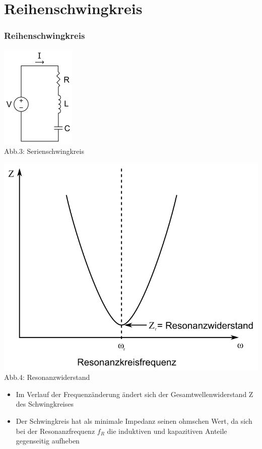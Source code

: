 \section*{Reihenschwingkreis}
\begin{frame}
\frametitle{Reihenschwingkreis}
\begin{center}
	\begin{minipage}{0.4\textwidth}
	\includegraphics[scale=0.8]{a04/Serirenschw.png}\\
	\tiny{Abb.3: Serienschwingkreis \cite{wmen}}
	\end{minipage}
	\begin{minipage}{0.4\textwidth}
	\includegraphics[scale=0.2]{a04/SerirenschwSig.png}\\
	\tiny{Abb.4: Resonanzwiderstand \cite{wmen}} 
	\end{minipage}
\end{center}
\begin{itemize}
	\item Im Verlauf der Frequenzänderung ändert sich der Gesamtwellenwiderstand Z des Schwingkreises
	\item Der Schwingkreis hat als minimale Impedanz seinen ohmschen Wert, da sich bei der Resonanzfrequenz $f_R$ die induktiven und kapazitiven Anteile gegenseitig aufheben
\end{itemize}
\end{frame}

